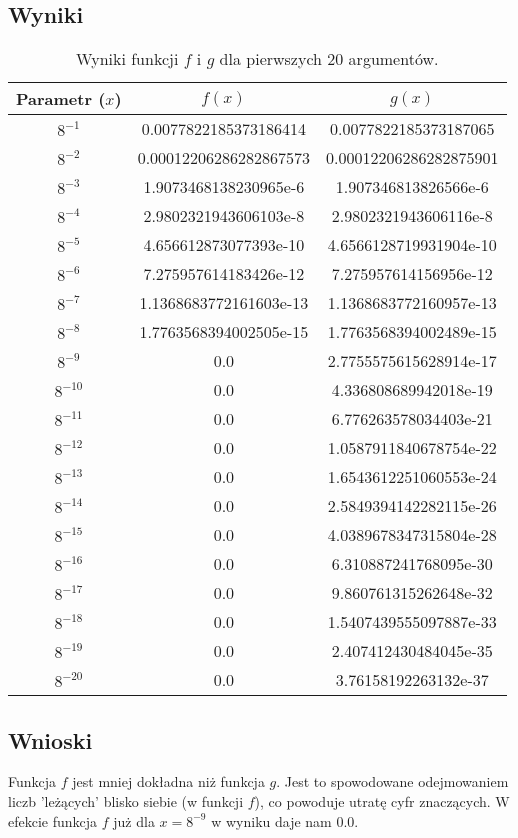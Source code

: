 \documentclass[]{article}
\begin{document}
\subsection{Wyniki}
\begin{table}[h]
	\centering
	\begin{tabular}{||c c c||} 
		\hline
		Parametr ($x$) & $f(x)$ & $g(x)$\\ [0.5ex] 
		\hline\hline
		$8^{-1}$ & 0.0077822185373186414 & 0.0077822185373187065\\ 
		$8^{-2}$ & 0.00012206286282867573& 0.00012206286282875901\\
		$8^{-3}$ & 1.9073468138230965e-6& 1.907346813826566e-6\\ 
		$8^{-4}$ & 2.9802321943606103e-8& 2.9802321943606116e-8\\
		$8^{-5}$ & 4.656612873077393e-10& 4.6566128719931904e-10\\ 
		$8^{-6}$ & 7.275957614183426e-12& 7.275957614156956e-12\\
		$8^{-7}$ & 1.1368683772161603e-13& 1.1368683772160957e-13\\ 
		$8^{-8}$ & 1.7763568394002505e-15& 1.7763568394002489e-15\\
		$8^{-9}$ & 0.0& 2.7755575615628914e-17\\ 
		$8^{-10}$ & 0.0& 4.336808689942018e-19\\
		$8^{-11}$ & 0.0& 6.776263578034403e-21\\ 
		$8^{-12}$ & 0.0& 1.0587911840678754e-22\\
		$8^{-13}$ & 0.0& 1.6543612251060553e-24\\ 
		$8^{-14}$ & 0.0& 2.5849394142282115e-26\\
		$8^{-15}$ & 0.0& 4.0389678347315804e-28\\ 
		$8^{-16}$ & 0.0& 6.310887241768095e-30\\
		$8^{-17}$ & 0.0& 9.860761315262648e-32\\ 
		$8^{-18}$ & 0.0& 1.5407439555097887e-33\\
		$8^{-19}$ & 0.0& 2.407412430484045e-35\\ 
		$8^{-20}$ & 0.0& 3.76158192263132e-37\\
		\hline
	\end{tabular}
	\caption{Wyniki funkcji $f$ i $g$ dla pierwszych 20 argumentów.}
\end{table}
\subsection{Wnioski}
Funkcja $f$ jest mniej dokładna niż funkcja $g$. Jest to spowodowane odejmowaniem liczb 'leżących' blisko siebie (w funkcji $f$), co powoduje utratę cyfr znaczących. W efekcie funkcja $f$ już dla $x = 8^{-9}$ w wyniku daje nam $0.0$.
\end{document}
